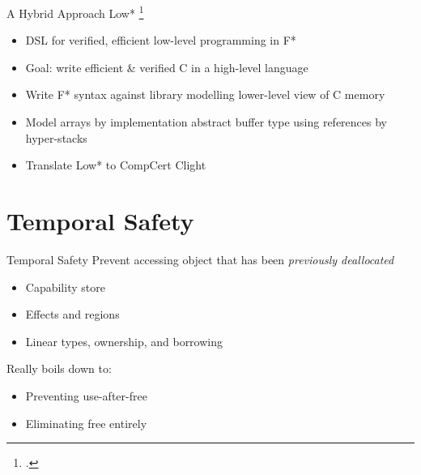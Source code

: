 \documentclass[aspectratio=169]{beamer}
\begin{document}
\begin{frame}{A Hybrid Approach}
Low* \footcite{protzenko_verified_2017}
\begin{itemize}
    \item DSL for verified, efficient low-level programming in F* %
    \item Goal: write efficient \& verified C in a high-level language
    \item Write F* syntax against library modelling lower-level view of C memory
    \item Model arrays by implementation abstract buffer type using references by hyper-stacks %
    \item Translate Low* to CompCert Clight
\end{itemize}
\end{frame}


\section{Temporal Safety}

\begin{frame}[fragile]{Temporal Safety}
Prevent accessing object that has been \emph{previously deallocated}
\\
\begin{itemize}
   \item Capability store
   \item Effects and regions
   \item Linear types, ownership, and borrowing
\end{itemize}

Really boils down to:
\begin{itemize}
    \item Preventing use-after-free
    \item Eliminating free entirely 
\end{itemize}

\end{frame}
\end{document}
